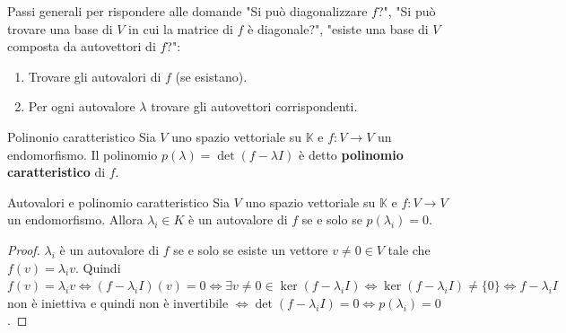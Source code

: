 \documentclass[a4paper]{article}
\theoremstyle{definition}
\begin{document}
	Passi generali per rispondere alle domande "Si può diagonalizzare $f$?",
	"Si può trovare una base di $V$ in cui la matrice di $f$ è diagonale?",
	"esiste una base di $V$ composta da autovettori di $f$?":
	\begin{enumerate}
		\item Trovare gli autovalori di $f$ (se esistano).
		\item Per ogni autovalore $\lambda$ trovare gli autovettori corrispondenti.
	\end{enumerate}

	\begin{deff}{Polinonio caratteristico}{}
		Sia $V$ uno spazio vettoriale su $\mathbb{K}$ e $f: V \to V$ un endomorfismo.
		Il polinomio $p(\lambda) = \det(f - \lambda I)$ è detto \textbf{polinomio caratteristico} di $f$.
	\end{deff}
	\begin{teo}{Autovalori e polinomio caratteristico}{}
		Sia $V$ uno spazio vettoriale su $\mathbb{K}$ e $f: V \to V$ un endomorfismo.
		Allora $\lambda_i \in K$ è un autovalore di $f$ se e solo se $p(\lambda_i) = 0$.
	\end{teo}
	\begin{proof}
		$\lambda_i$ è un autovalore di $f$ se e solo se esiste un vettore $v \ne 0 \in V$ tale che $f(v) = \lambda_i v$.
		Quindi $f(v) = \lambda_i v \Leftrightarrow (f - \lambda_i I)(v) = 0 \Leftrightarrow \exists v \ne 0 \in \ker (f - \lambda_i I)
		\Leftrightarrow \ker (f - \lambda_i I) \ne \{0\} \Leftrightarrow f - \lambda_i I$ non è iniettiva e quindi non è invertibile
		$\Leftrightarrow \det(f - \lambda_i I) = 0 \Leftrightarrow p(\lambda_i) = 0$. 
	\end{proof}
\end{document}
